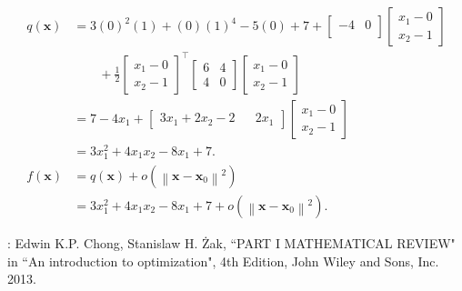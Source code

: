 \begin{equation*}
	\begin{aligned}
	q(\boldsymbol{x})
		  & = 3(0)^{2}(1)+(0)(1)^{4}-5(0)+7 
		  		+ \left[\begin{array}{cc} -4 & 0 \\ \end{array}\right] 
		  		\left[\begin{array}{c} x_{1}-0 \\ x_{2}-1 \end{array}\right]\\
		  &	\qquad +  \frac{1}{2} \left[\begin{array}{c} x_{1}-0 \\ x_{2}-1 \end{array}\right]^{\top}
		  		\left[\begin{array}{ll}6 & 4 \\ 4 & 0\end{array}\right]
		  		\left[\begin{array}{c} x_{1}-0 \\ x_{2}-1 \end{array}\right] \\
		  & = 7 - 4x_{1} + \left[\begin{array}{cccc} 3x_{1}+2x_{2} -2 & & 2x_{1} \end{array}\right]
		  		\left[\begin{array}{c} x_{1}-0 \\ x_{2}-1 \end{array}\right] \\
		  & =3 x_{1}^{2}+4 x_{1} x_{2}-8 x_{1}+7. \\
		 f(\boldsymbol{x})
		 & =q(\boldsymbol{x})+o\left(\left\|\boldsymbol{x}-\boldsymbol{x}_{0}\right\|^{2}\right) \\
		 & =3 x_{1}^{2}+4 x_{1} x_{2}-8 x_{1}+7 +o\left(\left\|\boldsymbol{x}-\boldsymbol{x}_{0}\right\|^{2}\right).
	\end{aligned}
\end{equation*}

\bigskip

\noindent
[Ref]: Edwin K.P. Chong, Stanislaw H. Żak, ``PART I MATHEMATICAL REVIEW" in ``An introduction to optimization", 4th Edition, John Wiley and Sons, Inc. 2013.
